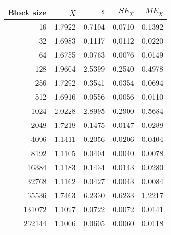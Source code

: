 \begin{tabular}{rrrrr}\toprule
{\small Block size} & $\bar{X}$ & $s$ & $SE_{\bar{X}}$ & $ME_{\bar{X}}$ \\\midrule
16 & 1.7922 & 0.7104 & 0.0710 & 0.1392\\
32 & 1.6983 & 0.1117 & 0.0112 & 0.0220\\
64 & 1.6755 & 0.0763 & 0.0076 & 0.0149\\
128 & 1.9604 & 2.5399 & 0.2540 & 0.4978\\
256 & 1.7292 & 0.3541 & 0.0354 & 0.0694\\
512 & 1.6916 & 0.0556 & 0.0056 & 0.0110\\
1024 & 2.0228 & 2.8995 & 0.2900 & 0.5684\\
2048 & 1.7218 & 0.1475 & 0.0147 & 0.0288\\
4096 & 1.1411 & 0.2056 & 0.0206 & 0.0404\\
8192 & 1.1105 & 0.0404 & 0.0040 & 0.0078\\
16384 & 1.1183 & 0.1434 & 0.0143 & 0.0280\\
32768 & 1.1162 & 0.0427 & 0.0043 & 0.0084\\
65536 & 1.7463 & 6.2330 & 0.6233 & 1.2217\\
131072 & 1.1027 & 0.0722 & 0.0072 & 0.0141\\
262144 & 1.1006 & 0.0605 & 0.0060 & 0.0118\\
\bottomrule
\end{tabular}
